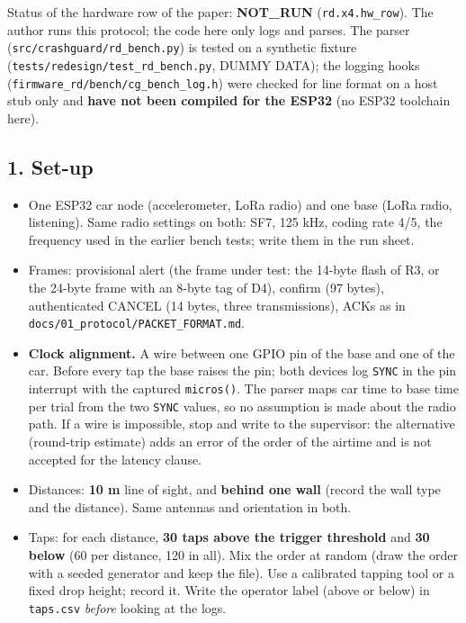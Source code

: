 


Status of the hardware row of the paper: \textbf{NOT\_RUN} (\texttt{rd.x4.hw\_row}). The author runs this protocol; the code here only logs and parses. The parser (\texttt{src/crashguard/rd\_bench.py}) is tested on a synthetic fixture (\texttt{tests/redesign/test\_rd\_bench.py}, DUMMY DATA); the logging hooks (\texttt{firmware\_rd/bench/cg\_bench\_log.h}) were checked for line format on a host stub only and \textbf{have not been compiled for the ESP32} (no ESP32 toolchain here).

\subsection*{1. Set-up}
\begin{itemize}
\item One ESP32 car node (accelerometer, LoRa radio) and one base (LoRa radio, listening). Same radio settings on both: SF7, 125 kHz, coding rate 4/5, the frequency used in the earlier bench tests; write them in the run sheet.
\item Frames: provisional alert (the frame under test: the 14-byte flash of R3, or the 24-byte frame with an 8-byte tag of D4), confirm (97 bytes), authenticated CANCEL (14 bytes, three transmissions), ACKs as in \texttt{docs/01\_protocol/PACKET\_FORMAT.md}.
\item \textbf{Clock alignment.} A wire between one GPIO pin of the base and one of the car. Before every tap the base raises the pin; both devices log \texttt{SYNC} in the pin interrupt with the captured \texttt{micros()}. The parser maps car time to base time per trial from the two \texttt{SYNC} values, so no assumption is made about the radio path. If a wire is impossible, stop and write to the supervisor: the alternative (round-trip estimate) adds an error of the order of the airtime and is not accepted for the latency clause.
\item Distances: \textbf{10 m} line of sight, and \textbf{behind one wall} (record the wall type and the distance). Same antennas and orientation in both.
\item Taps: for each distance, \textbf{30 taps above the trigger threshold} and \textbf{30 below} (60 per distance, 120 in all). Mix the order at random (draw the order with a seeded generator and keep the file). Use a calibrated tapping tool or a fixed drop height; record it. Write the operator label (above or below) in \texttt{taps.csv} \emph{before} looking at the logs.
\end{itemize}

